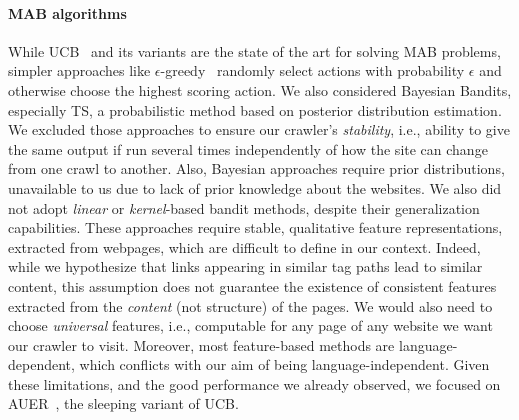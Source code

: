\begin{toappendix}
\paragraph*{MAB algorithms} While UCB~\cite{auer2002finite} and its
variants are the state of the art for solving MAB problems, simpler approaches like $\epsilon$-greedy~\cite{sutton2018reinforcement} randomly select actions with probability $\epsilon$ and otherwise choose the highest scoring action. We also considered {Bayesian} Bandits, especially TS, a probabilistic method based on posterior distribution estimation. We excluded those approaches to ensure our crawler's {\em stability}, i.e., ability to give the same output if run several times independently of how the site can change from one crawl to
another. Also, Bayesian approaches require prior distributions, unavailable to us due to lack of prior knowledge about the websites. We also did not adopt \emph{linear} or \emph{kernel}-based bandit methods, despite their generalization capabilities. These approaches require stable, qualitative feature representations, extracted from webpages, which are difficult to define in our context. Indeed, while we hypothesize that links appearing in similar tag paths lead to similar content, this assumption does not guarantee the existence of consistent features extracted from the \emph{content} (not structure) of the pages. We would also need to choose \emph{universal} features, i.e., computable for any page of any website we want our crawler to visit. Moreover, most feature-based methods are language-dependent, which conflicts with our aim of being language-independent. Given these limitations, and the good performance we already observed, we focused on AUER~\cite{kleinberg2010regret}, the sleeping variant of UCB.
\end{toappendix}
